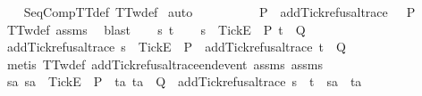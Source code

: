 \begin{isabellebody}
{%
\isadelimproof
\ \ %
\endisadelimproof
%
\isatagproof
{}\isamarkupfalse%
\ SeqCompTT{\isacharunderscore}def\ TT{}w{\isacharunderscore}def\isanewline
{}\isamarkupfalse%
\ auto\isanewline
\ \ \isamarkupfalse%
\ {\isasymrho}\isanewline
\ \ \isamarkupfalse%
\ {\isachardoublequoteopen}{\isasymrho}\ {\isasymin}\ P\ {\isasymLongrightarrow}\ add{\isacharunderscore}Tick{\isacharunderscore}refusal{\isacharunderscore}trace\ {\isasymrho}\ {\isasymin}\ P{\isachardoublequoteclose}\isanewline
\ \ \ \ \isamarkupfalse%
\ TT{}w{\isacharunderscore}def\ assms{\isacharparenleft}{}{\isacharparenright}\ \isamarkupfalse%
\ blast\isanewline
{}\isamarkupfalse%
\isanewline
\ \ \isamarkupfalse%
\ s\ t\isanewline
\ \ \isamarkupfalse%
\ {\isachardoublequoteopen}s\ {\isacharat}\ {\isacharbrackleft}{\isacharbrackleft}Tick{\isacharbrackright}\isactrlsub E{\isacharbrackright}\ {\isasymin}\ P{\isachardoublequoteclose}\ {\isachardoublequoteopen}t\ {\isasymin}\ Q{\isachardoublequoteclose}\isanewline
\ \ \isamarkupfalse%
\ \isamarkupfalse%
\ {\isachardoublequoteopen}add{\isacharunderscore}Tick{\isacharunderscore}refusal{\isacharunderscore}trace\ s\ {\isacharat}\ {\isacharbrackleft}{\isacharbrackleft}Tick{\isacharbrackright}\isactrlsub E{\isacharbrackright}\ {\isasymin}\ P\ {\isasymand}\ add{\isacharunderscore}Tick{\isacharunderscore}refusal{\isacharunderscore}trace\ t\ {\isasymin}\ Q{\isachardoublequoteclose}\isanewline
\ \ \ \ \isamarkupfalse%
\ {\isacharparenleft}metis\ TT{}w{\isacharunderscore}def\ add{\isacharunderscore}Tick{\isacharunderscore}refusal{\isacharunderscore}trace{\isacharunderscore}end{\isacharunderscore}event\ assms{\isacharparenleft}{}{\isacharparenright}\ assms{\isacharparenleft}{}{\isacharparenright}{\isacharparenright}\isanewline
\ \ \isamarkupfalse%
\ \isamarkupfalse%
\ {\isachardoublequoteopen}{\isasymforall}sa{\isachardot}\ sa\ {\isacharat}\ {\isacharbrackleft}{\isacharbrackleft}Tick{\isacharbrackright}\isactrlsub E{\isacharbrackright}\ {\isasymin}\ P\ {\isasymlongrightarrow}\ {\isacharparenleft}{\isasymforall}ta{\isachardot}\ ta\ {\isasymin}\ Q\ {\isasymlongrightarrow}\ add{\isacharunderscore}Tick{\isacharunderscore}refusal{\isacharunderscore}trace\ {\isacharparenleft}s\ {\isacharat}\ t{\isacharparenright}\ {\isasymnoteq}\ sa\ {\isacharat}\ ta{\isacharparenright}\ {\isasymLongrightarrow}\isanewline
}
\end{isabellebody}
